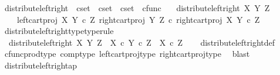 \begin{isabellebody}
\endisatagproof
{\isafoldproof}%
%
\isadelimproof
\isanewline
%
\endisadelimproof
\isanewline
{}\isamarkupfalse%
\ distribute{\isacharunderscore}{\kern0pt}left{\isacharunderscore}{\kern0pt}right\ {\isacharcolon}{\kern0pt}{\isacharcolon}{\kern0pt}\ {\isachardoublequoteopen}cset\ {\isasymRightarrow}\ cset\ {\isasymRightarrow}\ cset\ {\isasymRightarrow}\ cfunc{\isachardoublequoteclose}\ \isanewline
\ \ {\isachardoublequoteopen}distribute{\isacharunderscore}{\kern0pt}left{\isacharunderscore}{\kern0pt}right\ X\ Y\ Z\ {\isacharequal}{\kern0pt}\ \isanewline
\ \ \ \ {\isasymlangle}left{\isacharunderscore}{\kern0pt}cart{\isacharunderscore}{\kern0pt}proj\ X\ {\isacharparenleft}{\kern0pt}Y\ {\isasymtimes}\isactrlsub c\ Z{\isacharparenright}{\kern0pt}{\isacharcomma}{\kern0pt}\ right{\isacharunderscore}{\kern0pt}cart{\isacharunderscore}{\kern0pt}proj\ Y\ Z\ {\isasymcirc}\isactrlsub c\ right{\isacharunderscore}{\kern0pt}cart{\isacharunderscore}{\kern0pt}proj\ X\ {\isacharparenleft}{\kern0pt}Y\ {\isasymtimes}\isactrlsub c\ Z{\isacharparenright}{\kern0pt}{\isasymrangle}{\isachardoublequoteclose}\isanewline
\isanewline
{}\isamarkupfalse%
\ distribute{\isacharunderscore}{\kern0pt}left{\isacharunderscore}{\kern0pt}right{\isacharunderscore}{\kern0pt}type{\isacharbrackleft}{\kern0pt}type{\isacharunderscore}{\kern0pt}rule{\isacharbrackright}{\kern0pt}{\isacharcolon}{\kern0pt}\isanewline
\ \ {\isachardoublequoteopen}distribute{\isacharunderscore}{\kern0pt}left{\isacharunderscore}{\kern0pt}right\ X\ Y\ Z\ {\isacharcolon}{\kern0pt}\ X\ {\isasymtimes}\isactrlsub c\ {\isacharparenleft}{\kern0pt}Y\ {\isasymtimes}\isactrlsub c\ Z{\isacharparenright}{\kern0pt}\ {\isasymrightarrow}\ X\ {\isasymtimes}\isactrlsub c\ Z{\isachardoublequoteclose}\isanewline
%
\isadelimproof
\ \ %
\endisadelimproof
%
\isatagproof
{}\isamarkupfalse%
\ distribute{\isacharunderscore}{\kern0pt}left{\isacharunderscore}{\kern0pt}right{\isacharunderscore}{\kern0pt}def\isanewline
\ \ \isamarkupfalse%
\ cfunc{\isacharunderscore}{\kern0pt}prod{\isacharunderscore}{\kern0pt}type\ comp{\isacharunderscore}{\kern0pt}type\ left{\isacharunderscore}{\kern0pt}cart{\isacharunderscore}{\kern0pt}proj{\isacharunderscore}{\kern0pt}type\ right{\isacharunderscore}{\kern0pt}cart{\isacharunderscore}{\kern0pt}proj{\isacharunderscore}{\kern0pt}type\ \isamarkupfalse%
\ blast%
\endisatagproof
{\isafoldproof}%
%
\isadelimproof
\isanewline
%
\endisadelimproof
\isanewline
{}\isamarkupfalse%
\ distribute{\isacharunderscore}{\kern0pt}left{\isacharunderscore}{\kern0pt}right{\isacharunderscore}{\kern0pt}ap{\isacharcolon}{\kern0pt}\ \isanewline

\end{isabellebody}
